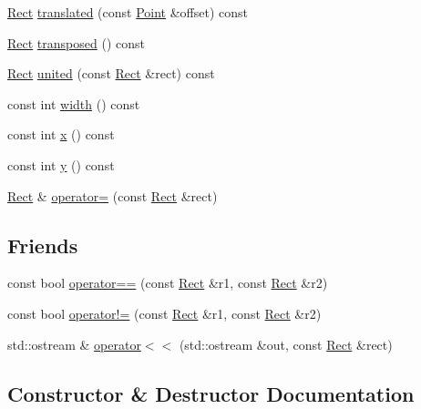 \begin{DoxyCompactItemize}
\item 
\hyperlink{classprism_1_1_rect}{Rect} \hyperlink{classprism_1_1_rect_ac71993c5f890157af1e3fa86423f8198}{translated} (const \hyperlink{classprism_1_1_point}{Point} \&offset) const 
\item 
\hyperlink{classprism_1_1_rect}{Rect} \hyperlink{classprism_1_1_rect_aa4f9bf21ac8c5a1d1b415df78ef5c0da}{transposed} () const 
\item 
\hyperlink{classprism_1_1_rect}{Rect} \hyperlink{classprism_1_1_rect_ac938b0ebead7062111728b6d2392e38a}{united} (const \hyperlink{classprism_1_1_rect}{Rect} \&rect) const 
\item 
const int \hyperlink{classprism_1_1_rect_a8dae47a50fdac7a5f7e8aabef68437aa}{width} () const 
\item 
const int \hyperlink{classprism_1_1_rect_a202fa9a56964c9111a968fb9b420f5f4}{x} () const 
\item 
const int \hyperlink{classprism_1_1_rect_a6e951744e0bba0fed781b86ab0be680b}{y} () const 
\item 
\hyperlink{classprism_1_1_rect}{Rect} \& \hyperlink{classprism_1_1_rect_ac49766a681e3ecb9e1515ab4cb2a8323}{operator=} (const \hyperlink{classprism_1_1_rect}{Rect} \&rect)
\end{DoxyCompactItemize}
\subsection*{Friends}
\begin{DoxyCompactItemize}
\item 
const bool \hyperlink{classprism_1_1_rect_ab32eafa53d6e2fedc5c4f4beeb10d12a}{operator==} (const \hyperlink{classprism_1_1_rect}{Rect} \&r1, const \hyperlink{classprism_1_1_rect}{Rect} \&r2)
\item 
const bool \hyperlink{classprism_1_1_rect_a649643043218228aae2b7d95e1a95dba}{operator!=} (const \hyperlink{classprism_1_1_rect}{Rect} \&r1, const \hyperlink{classprism_1_1_rect}{Rect} \&r2)
\item 
std\+::ostream \& \hyperlink{classprism_1_1_rect_a729ddc4e5633a601a2813d124209056f}{operator$<$$<$} (std\+::ostream \&out, const \hyperlink{classprism_1_1_rect}{Rect} \&rect)
\end{DoxyCompactItemize}


\subsection{Constructor \& Destructor Documentation}

